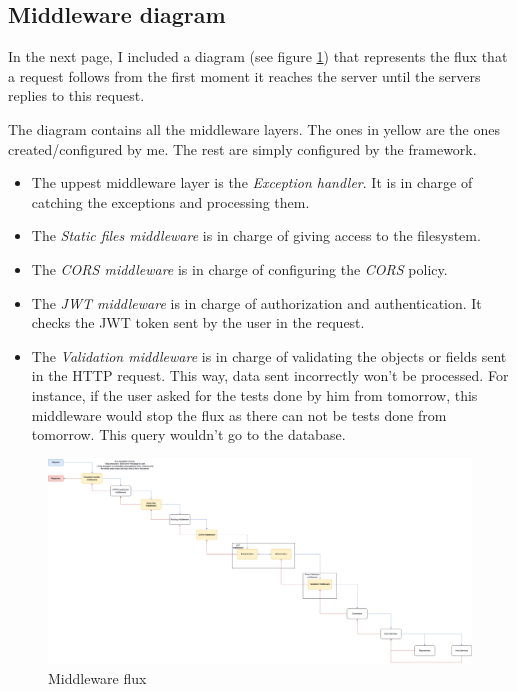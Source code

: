     \subsection{Middleware diagram}
        In the next page, I included a diagram (see figure \ref{fig:implementation_middleware}) that represents the flux that a request follows from the first moment it reaches the server until the servers replies to this request.

        The diagram contains all the middleware layers. The ones in yellow are the ones created/configured by me. The rest are simply configured by the framework.
        \begin{itemize}[noitemsep]
            \item The uppest middleware layer is the \textit{Exception handler}. It is in charge of catching the exceptions and processing them.
            \item The \textit{Static files middleware} is in charge of giving access to the filesystem.
            \item The \textit{CORS middleware} is in charge of configuring the \textit{CORS} policy.
            \item The \textit{JWT middleware} is in charge of authorization and authentication. It checks the {JWT token} sent by the user in the request. 
            \item The \textit{Validation middleware} is in charge of validating the objects or fields sent in the {HTTP request}. This way, data sent incorrectly won't be processed. For instance, if the user asked for the tests done by him from tomorrow, this middleware would stop the flux as there can not be tests done from tomorrow. This query wouldn't go to the database. 
        \end{itemize}
            \newpage
            \begin{figure}[H]
                \centering
                    \includegraphics[angle=90, width=\textwidth, height=\textheight]{assets/diagrams/middleware.png}
                \caption{Middleware flux}
                \label{fig:implementation_middleware}
            \end{figure}

